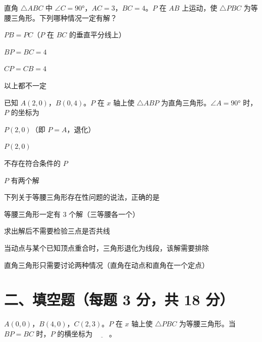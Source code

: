 \documentclass{exam-zh}
\begin{document}
\begin{question}[points=3]
  直角 $\triangle ABC$ 中 $\angle C = 90°$，$AC=3$，$BC=4$。$P$ 在 $AB$ 上运动，使 $\triangle PBC$ 为等腰三角形。下列哪种情况一定有解？
  \begin{choices}
    \item $PB=PC$（$P$ 在 $BC$ 的垂直平分线上）
    \item $BP=BC=4$
    \item $CP=CB=4$
    \item 以上都不一定
  \end{choices}
\end{question}



\begin{question}[points=3]
  已知 $A(2,0)$，$B(0,4)$。$P$ 在 $x$ 轴上使 $\triangle ABP$ 为直角三角形。$\angle A=90°$ 时，$P$ 的坐标为
  \begin{choices}
    \item $P(2,0)$（即 $P=A$，退化）
    \item $P(2,0)$
    \item 不存在符合条件的 $P$
    \item $P$ 有两个解
  \end{choices}
\end{question}



\begin{question}[points=3]
  下列关于等腰三角形存在性问题的说法，正确的是
  \begin{choices}
    \item 等腰三角形一定有 $3$ 个解（三等腰各一个）
    \item 求出解后不需要检验三点是否共线
    \item 当动点与某个已知顶点重合时，三角形退化为线段，该解需要排除
    \item 直角三角形只需要讨论两种情况（直角在动点和直角在一个定点）
  \end{choices}
\end{question}


\section*{二、填空题（每题 3 分，共 18 分）}


\begin{question}[points=3]
  $A(0,0)$，$B(4,0)$，$C(2,3)$。$P$ 在 $x$ 轴上使 $\triangle PBC$ 为等腰三角形。当 $BP=BC$ 时，$P$ 的横坐标为 $\underline{\quad\quad}$。
  \fillin
\end{question}
\end{document}
